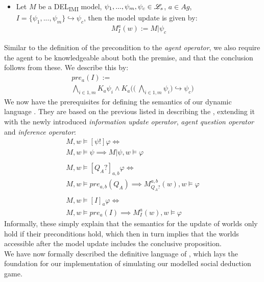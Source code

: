 \begin{itemize}
    \item Let $M$ be a DEL\textsubscript{IMI} model, $\psi_1,...,\psi_m, \psi_c \in
              \mathscr{L}_s$, $a\in Ag$, $I=\{\psi_1,...,\psi_m\} \hookrightarrow \psi_c$, then
          the model update is given by:
          \begin{gather}
              M^a_I(w) := M|\psi_c
          \end{gather}
\end{itemize}
Similar to the definition of the precondition to the \textit{agent operator}, we also require the agent to be knowledgeable about both the premise, and that the conclusion follows from these. We describe this by:
\begin{gather}
    \nonumber pre_{a}(I) := \\ \bigwedge\limits_{i\in1,m}K_a\psi_i \land K_a\Biggl(\Biggl(\:\bigwedge\limits_{i\in 1,m}\psi_i\Biggr) \hookrightarrow \psi_c \Biggr)
\end{gather}
We now have the prerequisites for defining the semantics of our dynamic language \dynlang. They are based on the previous listed in  describing the \staticlang, extending it with the newly introduced \textit{information update operator}, \textit{agent question operator} and \textit{inference operator}:
\begin{gather}
	M, w \models [\psi!]\varphi \iff \\
	\nonumber M, w \models \psi \implies M|\psi, w \models \varphi \\\nonumber \\
	M, w \models [Q_A?]_{a,b}\varphi \iff \\
	\nonumber M, w \models pre_{a,b}(Q_A) \implies M^{a,b}_{Q_A?}(w), w \models \varphi\\\nonumber\\
	M, w \models [I]_a\varphi \iff \\
	\nonumber M, w \models pre_a(I) \implies M^a_I(w), w \models \varphi
\end{gather}
Informally, these simply explain that the semantics for the update of worlds only hold if their preconditions hold, which then in turn implies that the worlds accessible after the model update includes the conclusive proposition. \\

We have now formally described the definitive language of \dynlang, which lays
the foundation for our implementation of simulating our modelled social
deduction game.